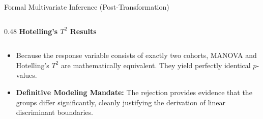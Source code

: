 \documentclass[8pt, aspectratio=169]{beamer}
\begin{document}
\begin{frame}{Formal Multivariate Inference (Post-Transformation)}
\begin{columns}[T]
        \begin{column}{0.48\textwidth}
            \centering
            \textbf{Hotelling's $T^2$ Results}
            \vspace{0.1cm}
            \begin{table}
            \end{table}
        \end{column}
    \end{columns}

    \vspace{-0.2cm}
    \begin{itemize}
        \item Because the response variable consists of exactly two cohorts, MANOVA and Hotelling's $T^2$ are mathematically equivalent. They yield perfectly identical $p$-values.
        \item \textbf{Definitive Modeling Mandate:} The rejection provides evidence that the groups differ significantly, cleanly justifying the derivation of linear discriminant boundaries.
    \end{itemize}
\end{frame}
\end{document}
